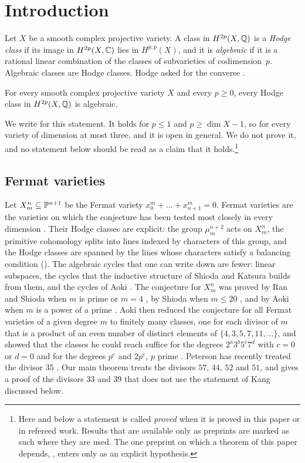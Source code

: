\section{Introduction}\label{sec:intro}

Let $X$ be a smooth complex projective variety. A class in $H^{2p}(X,\mathbb{Q})$ is
a \emph{Hodge class} if its image in $H^{2p}(X,\mathbb{C})$ lies in $H^{p,p}(X)$, and
it is \emph{algebraic} if it is a rational linear combination of the classes
of subvarieties of codimension~$p$. Algebraic classes are Hodge classes. Hodge
asked for the converse \cite{Hod52}.

\begin{conjecture}[Hodge]\label{conj:hodge}
For every smooth complex projective variety $X$ and every $p\ge0$, every
Hodge class in $H^{2p}(X,\mathbb{Q})$ is algebraic.
\end{conjecture}

We write \HC{} for this statement. It holds for $p\le1$ and $p\ge\dim X-1$, so
for every variety of dimension at most three, and it is open in general. We
do not prove it, and no statement below should be read as a claim that it
holds.\footnote{Here and below a statement is called \emph{proved} when
it is proved in this paper or in refereed work. Results that are available
only as preprints are marked as such where they are used. The one preprint
on which a theorem of this paper depends, \cite{OAI26}, enters only as an
explicit hypothesis.}

\subsection*{Fermat varieties}
Let $X^{n}_{m}\subseteq\mathbb{P}^{n+1}$ be the Fermat variety
$x_{0}^{m}+\dots+x_{n+1}^{m}=0$. Fermat varieties are the varieties on which
the conjecture has been tested most closely in every dimension
\cite{Ran80,Shi79}. Their Hodge classes are explicit: the group
$\mu_{m}^{n+2}$ acts on $X^{n}_{m}$, the primitive cohomology splits into
lines indexed by characters of this group, and the Hodge classes are spanned
by the lines whose characters satisfy a balancing condition
(). The algebraic cycles that one can write down are
fewer: linear subspaces, the cycles that the inductive structure of Shioda
and Katsura \cite{SK79} builds from them, and the cycles of Aoki
\cite{Aok87}. The conjecture for $X^{n}_{m}$ was proved by Ran and Shioda
when $m$ is prime or $m=4$ \cite{Ran80,Shi79}, by Shioda when $m\le20$
\cite{Shi79}, and by Aoki when $m$ is a power of a prime \cite{Aok87}. Aoki then reduced the conjecture for all Fermat varieties
of a given degree $m$ to finitely many classes, one for each divisor of $m$
that is a product of an even number of distinct elements of
$\{4,3,5,7,11,\dots\}$, and showed that the classes he could reach suffice
for the degrees $2^{a}3^{b}5^{c}7^{d}$ with $c=0$ or $d=0$ and for the degrees
$p^{e}$ and $2p^{e}$, $p$ prime \cite{Aok83,Aok00}. Peterson has recently
treated the divisor $35$ \cite{Pet26}. Our main theorem treats the divisors
$57$, $44$, $52$ and $51$, and gives a proof of the divisors $33$ and $39$
that does not use the statement of Kang discussed below.

